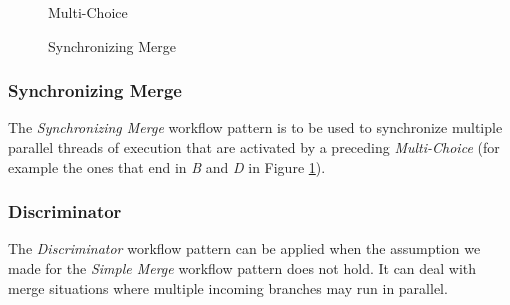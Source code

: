 \begin{figure}[htb]
  \begin{minipage}{0.45\textwidth}
    \begin{center}
      \caption[The \emph{Multi-Choice} workflow pattern]{Multi-Choice}
      \label{figure-MultiChoice}
    \end{center}
  \end{minipage}
  \hfill
  \begin{minipage}{0.45\textwidth}
    \begin{center}
      \caption[The \emph{Synchronizing Merge} workflow pattern]{Synchronizing Merge}
      \label{figure-SynchronizingMerge}
    \end{center}
  \end{minipage}
\end{figure}

\subsubsection{Synchronizing Merge}

The \emph{Synchronizing Merge} workflow pattern is to be used to synchronize
multiple parallel threads of execution that are activated by a preceding
\emph{Multi-Choice} (for example the ones that end in \emph{B} and \emph{D}
in Figure \ref{figure-SynchronizingMerge}).

\subsubsection{Discriminator}

The \emph{Discriminator} workflow pattern can be applied when the assumption
we made for the \emph{Simple Merge} workflow pattern does not hold. It can
deal with merge situations where multiple incoming branches may run in
parallel.

